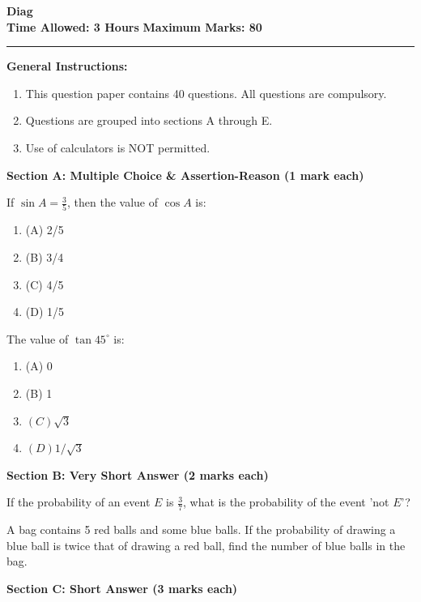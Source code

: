 \documentclass[12pt,a4paper]{exam}
\begin{document}
\thispagestyle{empty}
\begin{center}
  \textbf{\LARGE Diag} \\[0.3cm]
  \textbf{Time Allowed: 3 Hours} \hfill \textbf{Maximum Marks: 80} \\[0.3cm]
  \rule{\textwidth}{0.5pt}
\end{center}

\vspace{0.3cm}

\noindent\textbf{General Instructions:}
\begin{enumerate}
  \item {\normalfont\normalcolor This question paper contains 40 questions. All questions are compulsory.}
  \item {\normalfont\normalcolor Questions are grouped into sections A through E.}
  \item {\normalfont\normalcolor Use of calculators is NOT permitted.}
\end{enumerate}
\bigskip
\noindent\textbf{\large Section A: Multiple Choice \& Assertion-Reason (1 mark each)}

\begin{questions}
\question[1] If $\sin A = \frac{3}{5}$, then the value of $\cos A$ is:
\begin{enumerate}[label=(\Alph*)]
  \item (A) 2/5
  \item (B) 3/4
  \item (C) 4/5
  \item (D) 1/5
\end{enumerate}
\vspace{0.15cm}

\question[1] The value of $\tan 45^\circ$ is:
\begin{enumerate}[label=(\Alph*)]
  \item (A) 0
  \item (B) 1
  \item $(C) \sqrt{3}$
  \item $(D) 1/\sqrt{3}$
\end{enumerate}
\vspace{0.15cm}

\end{questions}
\bigskip
\noindent\textbf{\large Section B: Very Short Answer (2 marks each)}

\begin{questions}
\question[1] If the probability of an event $E$ is $\frac{3}{7}$, what is the probability of the event 'not $E$'?
\vspace{0.15cm}

\question[1] A bag contains 5 red balls and some blue balls. If the probability of drawing a blue ball is twice that of drawing a red ball, find the number of blue balls in the bag.
\vspace{0.15cm}

\end{questions}
\bigskip
\noindent\textbf{\large Section C: Short Answer (3 marks each)}
\end{document}
